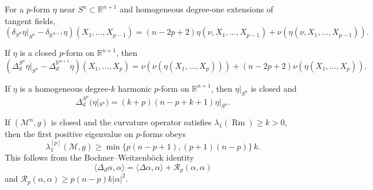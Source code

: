 \begin{lemma}
\label{lem:chow-iv-k25-codifferential-sphere}
For a $p$-form $\eta$ near $S^n\subset\mathbb R^{n+1}$ and homogeneous degree-one
extensions of tangent fields,
\[
(\delta_{S^n}\eta|_{S^n}-\delta_{\mathbb R^{n+1}}\eta)(X_1,\ldots,X_{p-1})
=(n-2p+2)\eta(\nu,X_1,\ldots,X_{p-1})
 +\nu\!\left(\eta(\nu,X_1,\ldots,X_{p-1})\right).
\]
\end{lemma}

\begin{lemma}
\label{lem:chow-iv-k26-hodge-laplacian-sphere}
If $\eta$ is a closed $p$-form on $\mathbb R^{n+1}$, then
\[
(\Delta_d^{S^n}\eta|_{S^n}-\Delta_d^{\mathbb R^{n+1}}\eta)(X_1,\ldots,X_p)
=\nu\!\left(\nu(\eta(X_1,\ldots,X_p))\right)
 +(n-2p+2)\nu(\eta(X_1,\ldots,X_p)).
\]
\end{lemma}

\begin{lemma}
\label{lem:chow-iv-k27-homogeneous-closed-forms}
If $\eta$ is a homogeneous degree-$k$ harmonic $p$-form on $\mathbb R^{n+1}$,
then $\eta|_{S^n}$ is closed and
\[
\Delta_d^{S^n}(\eta|_{S^n})=(k+p)(n-p+k+1)\eta|_{S^n}.
\]
\end{lemma}

\begin{theorem}
\label{thm:chow-iv-k28-gallot-meyer}
If $(\mathcal M^n,g)$ is closed and the curvature operator satisfies
$\lambda_1(\operatorname{Rm})\ge k>0$, then the first positive eigenvalue on
$p$-forms obeys
\[
\lambda_1^{[p]}(\mathcal M,g)\ge
\min\{p(n-p+1),(p+1)(n-p)\}\,k.
\]
This follows from the Bochner--Weitzenböck identity
\[
\langle\Delta_d\alpha,\alpha\rangle
=\langle\Delta\alpha,\alpha\rangle+\mathcal R_p(\alpha,\alpha)
\]
and $\mathcal R_p(\alpha,\alpha)\ge p(n-p)k|\alpha|^2$.
\end{theorem}
